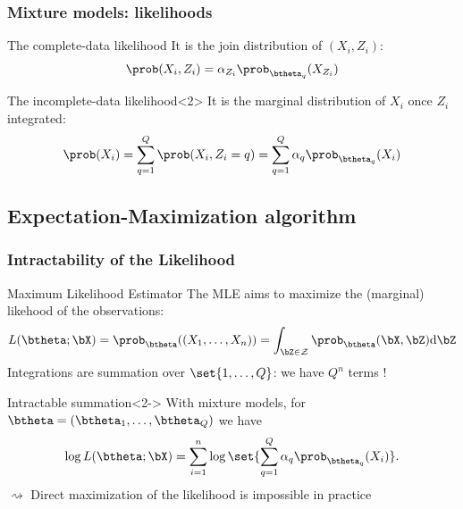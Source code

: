 \documentclass{beamer}\usepackage[]{graphicx}\usepackage[]{color}
\begin{document}
\begin{frame}
  \frametitle{Mixture models: likelihoods}

  \begin{block}{The complete-data likelihood}
    It is the join distribution of $(X_i,Z_i)$:
    \begin{equation*}
      \prob(X_i,Z_i) = \alpha_{Z_i} \prob_{\btheta_q}(X_{Z_i})
    \end{equation*}
  \end{block}

  \vspace{-.25cm}

  \begin{block}{The incomplete-data likelihood}<2>
    It is the marginal distribution of $X_i$ once $Z_i$ integrated:
    \begin{equation*}
      \prob(X_i) = \sum_{q=1}^Q \prob(X_i, Z_i = q)  = \sum_{q=1}^Q \alpha_q \prob_{\btheta_q}(X_i)
    \end{equation*}
  \end{block}

  \vspace{-.25cm}


\end{frame}

\subsection{Expectation-Maximization algorithm}

\begin{frame}
  \frametitle{Intractability of the Likelihood}

  \begin{block}{Maximum Likelihood Estimator}
    The MLE aims to maximize the (marginal) likehood of the observations:
    \begin{equation*}
      L(\btheta; \bX) = \prob_{\btheta}((X_1,\dots,X_n)) = \int_{\bZ \in \mathcal{Z}} \prob_{\btheta}(\bX,\bZ) \mathrm{d} \bZ
    \end{equation*}
    Integrations are summation over $\set{1,\dots,Q}$: we have $Q^n$ terms !
  \end{block}

  \vfill

  \begin{block}{Intractable summation}<2->
    With mixture models, for $\btheta = (\btheta_1,\dots,\btheta_Q)$ we have
    \begin{equation*}
      \log L(\btheta; \bX) = \sum_{i=1}^n \log \set{\sum_{q=1}^Q \alpha_q \prob_{\btheta_q}(X_i)}.
    \end{equation*}
    \alert{$\rightsquigarrow$ Direct maximization of the likelihood is impossible in practice}
  \end{block}

\end{frame}
\end{document}
